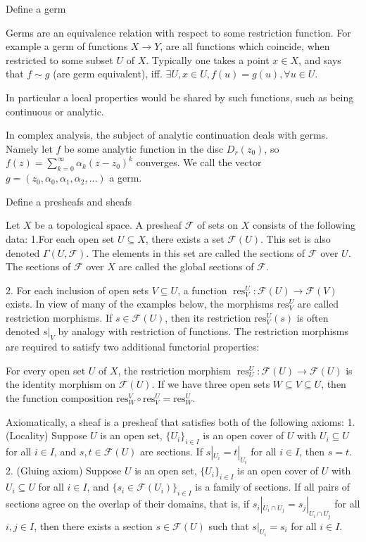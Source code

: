 Define a germ

Germs are an equivalence relation with respect to some restriction function.
For example a germ of functions \( X \to Y \), are all functions which coincide, when restricted 
to some subset \( U \) of \( X \). Typically one takes a point \( x \in X \), and says
that \( f \sim g \) (are germ equivalent), iff. \( \exists U, x \in U, f(u) = g(u), \forall u \in U \).

In particular a local properties would be shared by such functions, such as being continuous or analytic.

In complex analysis, the subject of analytic continuation deals with germs.
Namely let \( f \) be some analytic function in the disc \( D_r(z_0) \), so 
\( f(z)=\sum_{k=0}^\infty \alpha_k (z-z_0)^k \)
converges. We call the vector \( g = (z_0, \alpha_0, \alpha_1, \alpha_2, \ldots) \) a germ.


Define a presheafs and sheafs 

Let \(X\) be a topological space. A presheaf \(\mathcal{F}\) of sets on \(X\) consists of the following data:
1.For each open set \(U\subseteq X\), there exists a set \(\mathcal{F}(U)\). This set is also denoted \(\Gamma(U, \mathcal{F})\). 
  The elements in this set are called the sections of \(\mathcal{F}\) over \(U\). 
  The sections of \(\mathcal{F}\) over \(X\) are called the global sections of \(\mathcal{F}\).

2. For each inclusion of open sets \(V \subseteq U\), a function \(\operatorname{res}^{U}_{V} \colon \mathcal{F}(U) \rightarrow \mathcal{F}(V)\) exists. 
   In view of many of the examples below, the morphisms \(\text{res}^{U}_{V}\) are called restriction morphisms. 
   If \(s \in \mathcal{F}(U)\), then its restriction \(\text{res}^{U}_{V}(s)\) is often denoted \(s|_V\) by analogy with restriction of functions.
   The restriction morphisms are required to satisfy two additional functorial properties:

For every open set \(U\) of \(X\), the restriction morphism 
\(\operatorname{res}^{U}_{U} \colon \mathcal{F}(U) \rightarrow \mathcal{F}(U)\)
is the identity morphism on \(\mathcal{F}(U)\).
If we have three open sets \(W \subseteq V \subseteq U\), then the function composition \(\text{res}^{V}_{W}\circ\text{res}^{U}_{V}=\text{res}^{U}_{W}\).

Axiomatically, a sheaf is a presheaf that satisfies both of the following axioms:
1. (Locality) Suppose \(U\) is an open set, \(\{ U_i \}_{i \in I}\) is an open cover of \(U\) with \( U_i \subseteq U\) for all \( i \in I\), and \(s, t \in \mathcal{F}(U)\) 
    are sections. If \(s|_{ U_i} = t|_{ U_i}\) for all \(i \in I\), then \(s = t\).
2. (Gluing axiom) Suppose \(U\) is an open set, \(\{ U_i \}_{i \in I}\) is an open cover of \(U\) with \( U_i \subseteq U\) for all \( i \in I\), and 
    \(\{ s_i \in \mathcal{F}(U_i) \}_{i \in I}\) is a family of sections. If all pairs of sections agree on the overlap of their domains, that is, 
    if \(s_i|_{U_i\cap U_j} = s_j|_{U_i \cap U_j}\) for all \(i, j \in I\), then there exists a section \(s \in \mathcal{F}(U)\) such that \(s|_{U_i} = s_i\) for all \(i \in I\).

